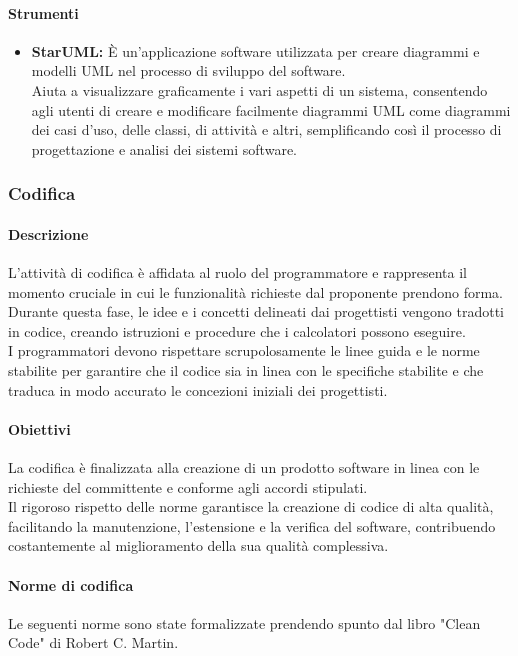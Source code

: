 \paragraph{Strumenti}
\begin{itemize}
    \item \textbf{StarUML:} 
    È un'applicazione software utilizzata per creare diagrammi e modelli UML nel processo di sviluppo del software. \\
    Aiuta a visualizzare graficamente i vari aspetti di un sistema, consentendo agli utenti di creare e modificare facilmente diagrammi UML come diagrammi dei casi d'uso, delle classi, di attività e altri, semplificando così il processo di progettazione e analisi dei sistemi software.
\end{itemize}

\subsubsection{Codifica}
\paragraph{Descrizione}
L'attività di codifica è affidata al ruolo del programmatore e rappresenta il momento cruciale in cui le funzionalità richieste dal proponente prendono forma. \\
Durante questa fase, le idee e i concetti delineati dai progettisti vengono tradotti in codice, creando istruzioni e procedure che i calcolatori possono eseguire. \\
I programmatori devono rispettare scrupolosamente le linee guida e le norme stabilite per garantire che il codice sia in linea con le specifiche stabilite e che traduca in modo accurato le concezioni iniziali dei progettisti.
\paragraph{Obiettivi}
La codifica è finalizzata alla creazione di un prodotto software in linea con le richieste del committente e conforme agli accordi stipulati.\\
Il rigoroso rispetto delle norme garantisce la creazione di codice di alta qualità, facilitando la manutenzione, l'estensione e la verifica del software, contribuendo costantemente al miglioramento della sua qualità complessiva.
\paragraph{Norme di codifica}
Le seguenti norme sono state formalizzate prendendo spunto dal libro "Clean Code" di Robert C. Martin.


